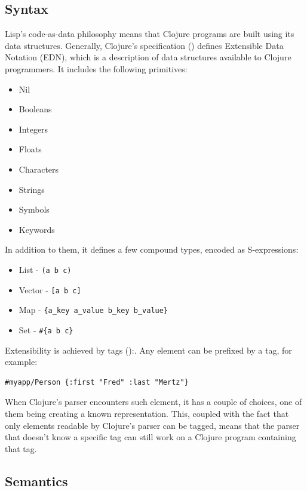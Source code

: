 \documentclass[11pt]{scrartcl}
\begin{document}
\subsection{Syntax}
Lisp’s code-as-data philosophy means that Clojure programs are built using its
data structures.
Generally, Clojure’s specification (\cite{clojure_spec}) defines Extensible Data Notation
(EDN), which is a description of data structures available to Clojure
programmers.
It includes the following primitives:
\begin{itemize}
  \item Nil
  \item Booleans
  \item Integers
  \item Floats
  \item Characters
  \item Strings
  \item Symbols
  \item Keywords
\end{itemize}
In addition to them, it defines a few compound types, encoded as S-expressions:
\begin{itemize}
  \item List - \lstinline$(a b c) $
  \item Vector - \lstinline$[a b c]$
  \item Map - \lstinline${a_key a_value b_key b_value}$
  \item Set - \lstinline$#{a b c}$
\end{itemize}
Extensibility is achieved by tags (\cite{edn_format}):. Any element can be
prefixed by a tag, for example:
\begin{lstlisting}
#myapp/Person {:first "Fred" :last "Mertz"} 
\end{lstlisting}
When Clojure’s parser encounters such element, it has a couple of choices, one
of them being creating a known representation.
This, coupled with the fact that only elements readable by Clojure’s parser can
be tagged, means that the parser that doesn’t know a specific tag can still work
on a Clojure program containing that tag.


\subsection{Semantics}
\end{document}
